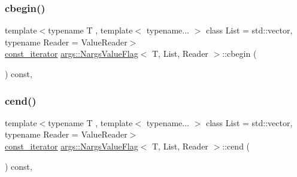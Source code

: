 \mbox{\label{classargs_1_1_nargs_value_flag_a18231a60382d2992a3fe76686557512f}} 
\subsubsection{\texorpdfstring{cbegin()}{cbegin()}}
{\footnotesize\ttfamily template$<$typename T , template$<$ typename... $>$ class List = std\+::vector, typename Reader  = Value\+Reader$>$ \\
\hyperlink{classargs_1_1_nargs_value_flag_a115760faf263d007148b30c99d8e6bdc}{const\+\_\+iterator} \hyperlink{classargs_1_1_nargs_value_flag}{args\+::\+Nargs\+Value\+Flag}$<$ T, List, Reader $>$\+::cbegin (\begin{DoxyParamCaption}{ }\end{DoxyParamCaption}) const\hspace{0.3cm}{\ttfamily [inline]}, {\ttfamily [noexcept]}}

\mbox{\label{classargs_1_1_nargs_value_flag_a835ee8e007c726d032318c24ac02c0c6}} 
\subsubsection{\texorpdfstring{cend()}{cend()}}
{\footnotesize\ttfamily template$<$typename T , template$<$ typename... $>$ class List = std\+::vector, typename Reader  = Value\+Reader$>$ \\
\hyperlink{classargs_1_1_nargs_value_flag_a115760faf263d007148b30c99d8e6bdc}{const\+\_\+iterator} \hyperlink{classargs_1_1_nargs_value_flag}{args\+::\+Nargs\+Value\+Flag}$<$ T, List, Reader $>$\+::cend (\begin{DoxyParamCaption}{ }\end{DoxyParamCaption}) const\hspace{0.3cm}{\ttfamily [inline]}, {\ttfamily [noexcept]}}

\mbox{\label{classargs_1_1_nargs_value_flag_afd4a39d8f62aec0daa30674548a30243}} 
